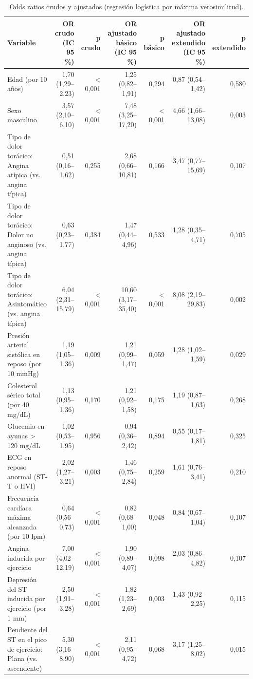 \begin{table}[H]
\caption{Odds ratios crudos y ajustados (regresión logística por máxima verosimilitud).}
\label{tab:or}
\begin{tabular}{lrrrrrr}
\toprule
Variable & OR crudo (IC 95 \%) & p crudo & OR ajustado básico (IC 95 \%) & p básico & OR ajustado extendido (IC 95 \%) & p extendido \\
\midrule
Edad (por 10 años) & 1,70 (1,29–2,23) & < 0,001 & 1,25 (0,82–1,91) & 0,294 & 0,87 (0,54–1,42) & 0,580 \\
Sexo masculino & 3,57 (2,10–6,10) & < 0,001 & 7,48 (3,25–17,20) & < 0,001 & 4,66 (1,66–13,08) & 0,003 \\
Tipo de dolor torácico: Angina atípica (vs. angina típica) & 0,51 (0,16–1,62) & 0,255 & 2,68 (0,66–10,81) & 0,166 & 3,47 (0,77–15,69) & 0,107 \\
Tipo de dolor torácico: Dolor no anginoso (vs. angina típica) & 0,63 (0,23–1,77) & 0,384 & 1,47 (0,44–4,96) & 0,533 & 1,28 (0,35–4,71) & 0,705 \\
Tipo de dolor torácico: Asintomático (vs. angina típica) & 6,04 (2,31–15,79) & < 0,001 & 10,60 (3,17–35,40) & < 0,001 & 8,08 (2,19–29,83) & 0,002 \\
Presión arterial sistólica en reposo (por 10 mmHg) & 1,19 (1,05–1,36) & 0,009 & 1,21 (0,99–1,47) & 0,059 & 1,28 (1,02–1,59) & 0,029 \\
Colesterol sérico total (por 40 mg/dL) & 1,13 (0,95–1,36) & 0,170 & 1,21 (0,92–1,58) & 0,175 & 1,19 (0,87–1,63) & 0,268 \\
Glucemia en ayunas > 120 mg/dL & 1,02 (0,53–1,95) & 0,956 & 0,94 (0,36–2,42) & 0,894 & 0,55 (0,17–1,81) & 0,325 \\
ECG en reposo anormal (ST-T o HVI) & 2,02 (1,27–3,21) & 0,003 & 1,46 (0,75–2,84) & 0,259 & 1,61 (0,76–3,41) & 0,210 \\
Frecuencia cardíaca máxima alcanzada (por 10 lpm) & 0,64 (0,56–0,73) & < 0,001 & 0,82 (0,68–1,00) & 0,048 & 0,84 (0,67–1,04) & 0,107 \\
Angina inducida por ejercicio & 7,00 (4,02–12,19) & < 0,001 & 1,90 (0,89–4,07) & 0,098 & 2,03 (0,86–4,82) & 0,107 \\
Depresión del ST inducida por ejercicio (por 1 mm) & 2,50 (1,91–3,28) & < 0,001 & 1,82 (1,23–2,69) & 0,003 & 1,43 (0,92–2,25) & 0,115 \\
Pendiente del ST en el pico de ejercicio: Plana (vs. ascendente) & 5,30 (3,16–8,90) & < 0,001 & 2,11 (0,95–4,72) & 0,068 & 3,17 (1,25–8,02) & 0,015 \\

\end{tabular}
\end{table}
